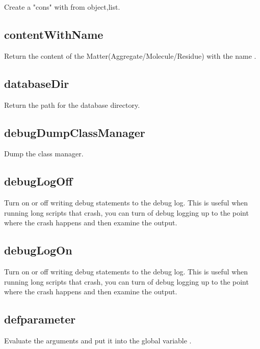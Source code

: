 \begin{itemize}
  Create a "cons" with from object,list.

\subsection{contentWithName}

Return the content of the Matter(Aggregate/Molecule/Residue) with the name .

\subsection{databaseDir}

  Return the path for the database directory.

\subsection{debugDumpClassManager}

  Dump the class manager.

\subsection{debugLogOff}

  Turn on or off writing debug statements to the debug log. This is useful when running
  long scripts that crash, you can turn of debug logging up to the point where
  the crash happens and then examine the output.

\subsection{debugLogOn}

  Turn on or off writing debug statements to the debug log. This is useful when running
  long scripts that crash, you can turn of debug logging up to the point where
  the crash happens and then examine the output.

\subsection{defparameter}
  \par

  Evaluate the arguments and put it into the global variable .


\end{itemize}
